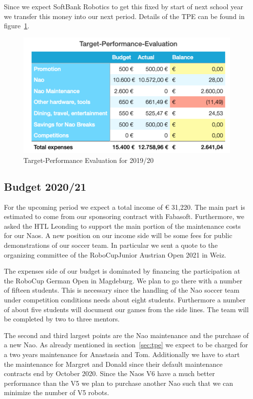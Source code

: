 \documentclass[11pt]{article}
\begin{document}
Since we expect SoftBank Robotics to get this fixed by start of next school year we transfer this money into our next period. Details of the TPE can be found in figure~\ref{fig:tpe}.
\begin{figure}
\begin{center}
\includegraphics[scale=0.5]{img/targetPerformanceEvaluation.png}
\end{center}
\caption{Target-Performance Evaluation for 2019/20}
\label{fig:tpe}
\end{figure}

\subsection{Budget 2020/21}\label{sec:budget}
For the upcoming period we expect a total income of € 31,220. The main part is estimated to come from our sponsoring contract with Fabasoft. Furthermore, we asked the HTL Leonding to support the main portion of the maintenance costs for our Naos. A new position on our income side will be some fees for public demonstrations of our soccer team. In particular we sent a quote to the organizing committee of the RoboCupJunior Austrian Open 2021 in Weiz.

The expenses side of our budget is dominated by financing the participation at the RoboCup German Open in Magdeburg. We plan to go there with a number of fifteen students. This is necessary since the handling of the Nao soccer team under competition conditions needs about eight students. Furthermore a number of about five students will document our games from the side lines. The team will be completed by two to three mentors.

The second and third largest points are the Nao maintenance and the purchase of a new Nao. As already mentioned in section~\ref{sec:tpe} we expect to be charged for a two years maintenance for Anastasia and Tom. Additionally we have to start the maintenance for Margret and Donald since their default maintenance contracts end by October 2020. Since the Naos V6 have a much better performance than the V5 we plan to purchase another Nao such that we can minimize the number of V5 robots. 
\end{document}
